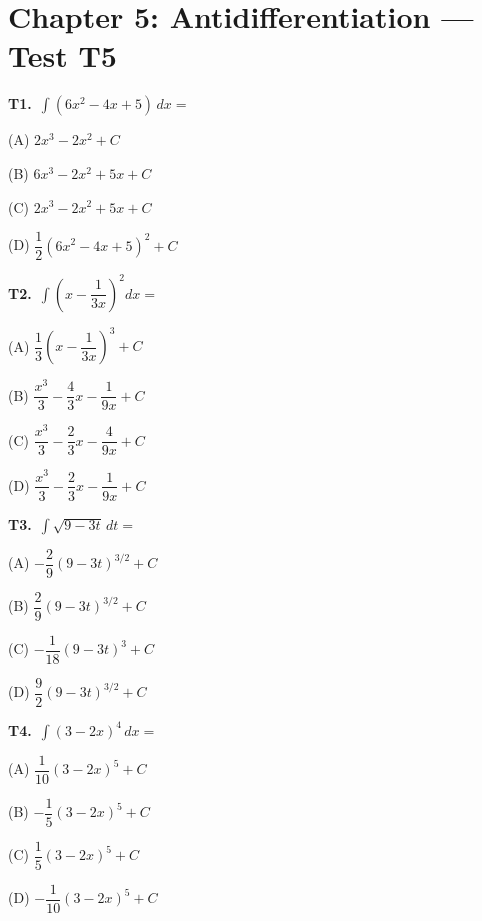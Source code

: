 \documentclass[11pt]{article}
\begin{document}
\section*{Chapter 5: Antidifferentiation --- Test T5}

\bigskip\noindent\textbf{T1.}\ $\displaystyle\int (6x^2-4x+5)\,dx =$
\begin{list}{}{\setlength{\leftmargin}{3em}\setlength{\labelwidth}{2.5em}\setlength{\itemsep}{0pt}\setlength{\topsep}{2pt}}
\item[(A)] $2x^3-2x^2+C$
\item[(B)] $6x^3-2x^2+5x+C$
\item[(C)] $2x^3-2x^2+5x+C$
\item[(D)] $\dfrac{1}{2}(6x^2-4x+5)^2+C$
\end{list}

\bigskip\noindent\textbf{T2.}\ $\displaystyle\int \left(x-\dfrac{1}{3x}\right)^2 dx =$
\begin{list}{}{\setlength{\leftmargin}{3em}\setlength{\labelwidth}{2.5em}\setlength{\itemsep}{0pt}\setlength{\topsep}{2pt}}
\item[(A)] $\dfrac{1}{3}\left(x-\dfrac{1}{3x}\right)^3+C$
\item[(B)] $\dfrac{x^3}{3}-\dfrac{4}{3}x-\dfrac{1}{9x}+C$
\item[(C)] $\dfrac{x^3}{3}-\dfrac{2}{3}x-\dfrac{4}{9x}+C$
\item[(D)] $\dfrac{x^3}{3}-\dfrac{2}{3}x-\dfrac{1}{9x}+C$
\end{list}

\bigskip\noindent\textbf{T3.}\ $\displaystyle\int \sqrt{9-3t}\,dt =$
\begin{list}{}{\setlength{\leftmargin}{3em}\setlength{\labelwidth}{2.5em}\setlength{\itemsep}{0pt}\setlength{\topsep}{2pt}}
\item[(A)] $-\dfrac{2}{9}(9-3t)^{3/2}+C$
\item[(B)] $\dfrac{2}{9}(9-3t)^{3/2}+C$
\item[(C)] $-\dfrac{1}{18}(9-3t)^3+C$
\item[(D)] $\dfrac{9}{2}(9-3t)^{3/2}+C$
\end{list}

\bigskip\noindent\textbf{T4.}\ $\displaystyle\int (3-2x)^4\,dx =$
\begin{list}{}{\setlength{\leftmargin}{3em}\setlength{\labelwidth}{2.5em}\setlength{\itemsep}{0pt}\setlength{\topsep}{2pt}}
\item[(A)] $\dfrac{1}{10}(3-2x)^5+C$
\item[(B)] $-\dfrac{1}{5}(3-2x)^5+C$
\item[(C)] $\dfrac{1}{5}(3-2x)^5+C$
\item[(D)] $-\dfrac{1}{10}(3-2x)^5+C$
\end{list}
\end{document}
